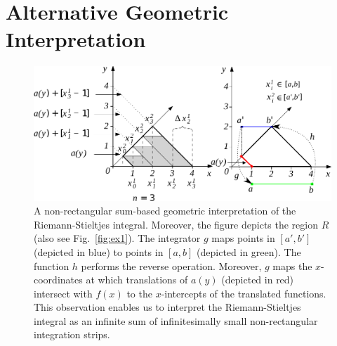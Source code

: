 \documentclass{article}
\theoremstyle{theorem}
\theoremstyle{definition}
\begin{document}
\section{Alternative Geometric Interpretation}
\begin{figure}[htb]
\centering
\includegraphics[width=1\textwidth]{fig13_change}
\caption{A non-rectangular sum-based geometric interpretation of the Riemann-Stieltjes integral. Moreover, the figure depicts the region $R$ (also see Fig.~\ref{fig:ex1}). The integrator $g$ maps points 
in $[a',b']$ (depicted in blue) to points in $[a,b]$ (depicted in green). The function $h$ performs the reverse operation. Moreover, $g$ maps the $x$-coordinates at which
translations of $a(y)$ (depicted in red) intersect with $f(x)$ to the $x$-intercepts of the translated functions. This observation enables us to interpret the Riemann-Stieltjes integral as an infinite sum of infinitesimally small non-rectangular integration 
strips.}
\label{fig:2d_geo}
\end{figure}
\end{document}
